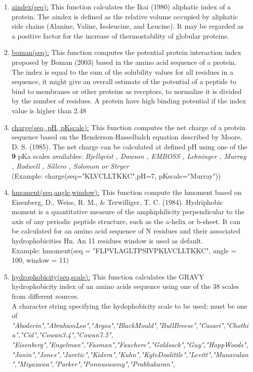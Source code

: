 \documentclass[a4paper,12pt, english]{article}
\begin{document}
\begin{enumerate}
	\item  \underline{aindex(seq):} This function calculates the Ikai (1980) aliphatic index of a protein. The aindex is defined as the relative volume occupied by aliphatic side chains (Alanine, Valine, Isoleucine, and Leucine). It may be regarded as a positive factor for the increase of thermostability of globular proteins.
	\item  \underline{boman(seq):} This function computes the potential protein interaction index proposed by Boman (2003) based in the amino acid sequence of a protein. The index is equal to the sum of the solubility values for all residues in a sequence, it might give an overall estimate of the potential of a peptide to bind to membranes or other proteins as receptors, to normalize it is divided by the number of residues. A protein have high binding potential if the index value is higher than 2.48
	\item \underline{charge(seq, pH, pKscale):}  This function computes the net charge of a protein sequence based on the Henderson-Hasselbalch equation described by Moore, D. S. (1985). The net charge can be calculated at defined pH using one of the \textbf{9} pKa scales availables: \emph{Bjellqvist , Dawson , EMBOSS , Lehninger , Murray , Rodwell , Sillero , Solomon or Stryer}\\(Example: charge(seq="KLVCLLTKKC",pH=7, pKscale="Murray"))
	\item \underline{hmoment(seq,angle,window):} This function compute the hmoment based on Eisenberg, D., Weiss, R. M., \& Terwilliger, T. C. (1984). Hydriphobic moment is a quantitative measure of the amphiphilicity perpendicular to the axis of any periodic peptide structure, such as the a-helix or b-sheet. It can be calculated for an amino acid sequence of N residues and their associated hydrophobicities Hn. An 11 residues window is used as default.\\Example: hmoment(seq = "FLPVLAGLTPSIVPKLVCLLTKKC", angle = 100, window = 11)
	\item \underline{hydrophobicity(seq,scale):} This function calculates the GRAVY hydrophobicity index of an amino acids sequence using one of the 38 scales from different sources.\\
	A character string specifying the hydophobicity scale to be used; must be one of \emph{"Aboderin","AbrahamLeo","Argos","BlackMould","BullBreese","Casari","Chothia","Cid","Cowan3.4","Cowan7.5",
"Eisenberg","Engelman","Fasman","Fauchere","Goldsack","Guy","HoppWoods","Janin","Jones","Juretic","Kidera","Kuhn","KyteDoolittle","Levitt","Manavalan","Miyazawa","Parker","Ponnuswamy","Prabhakaran",
}
\end{enumerate}
\end{document}
